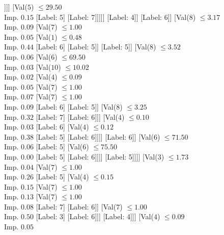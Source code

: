 \documentclass[margin=10pt]{standalone}
\begin{document}
\begin{forest}
																	[Label: 5]
																	[Label: 6]]]]
														[Val($5$) $ \leq 29.50$ \\ Imp. $0.15$
															[Label: 5]
															[Label: 7]]]]]
											[Label: 4]]
										[Label: 6]]
									[Val($8$) $ \leq 3.17$ \\ Imp. $0.09$
										[Val($7$) $ \leq 1.00$ \\ Imp. $0.05$
											[Val($1$) $ \leq 0.48$ \\ Imp. $0.44$
												[Label: 6]
												[Label: 5]]
											[Label: 5]]
										[Val($8$) $ \leq 3.52$ \\ Imp. $0.06$
											[Val($6$) $ \leq 69.50$ \\ Imp. $0.03$
												[Val($10$) $ \leq 10.02$ \\ Imp. $0.02$
													[Val($4$) $ \leq 0.09$ \\ Imp. $0.05$
														[Val($7$) $ \leq 1.00$ \\ Imp. $0.07$
															[Val($7$) $ \leq 1.00$ \\ Imp. $0.09$
																[Label: 6]
																[Label: 5]]
															[Val($8$) $ \leq 3.25$ \\ Imp. $0.32$
																[Label: 7]
																[Label: 6]]]
														[Val($4$) $ \leq 0.10$ \\ Imp. $0.03$
															[Label: 6]
															[Val($4$) $ \leq 0.12$ \\ Imp. $0.38$
																[Label: 5]
																[Label: 6]]]]
													[Label: 6]]
												[Val($6$) $ \leq 71.50$ \\ Imp. $0.06$
													[Label: 5]
													[Val($6$) $ \leq 75.50$ \\ Imp. $0.00$
														[Label: 5]
														[Label: 6]]]]
											[Label: 5]]]]
								[Val($3$) $ \leq 1.73$ \\ Imp. $0.04$
									[Val($7$) $ \leq 1.00$ \\ Imp. $0.26$
										[Label: 5]
										[Val($4$) $ \leq 0.15$ \\ Imp. $0.15$
											[Val($7$) $ \leq 1.00$ \\ Imp. $0.13$
												[Val($7$) $ \leq 1.00$ \\ Imp. $0.08$
													[Label: 7]
													[Label: 6]]
												[Val($7$) $ \leq 1.00$ \\ Imp. $0.50$
													[Label: 3]
													[Label: 6]]]
											[Label: 4]]]
									[Val($4$) $ \leq 0.09$ \\ Imp. $0.05$

\end{forest}
\end{document}
